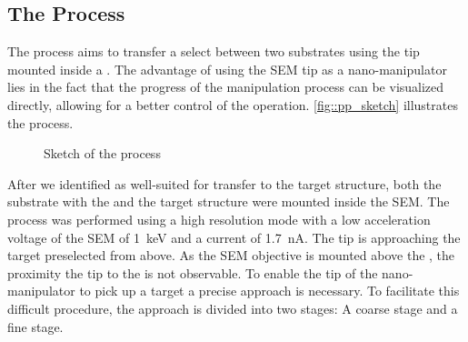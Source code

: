 	\subsection{The \PP Process}

			The \pp process aims to transfer a select \nd between two substrates using the tip mounted inside a \sem. The advantage of using the SEM tip as a nano-manipulator lies in the fact that the progress of the manipulation process can be visualized directly, allowing for a better control of the operation. \autoref{fig::pp_sketch} illustrates the process.

			\begin{figure}[htp]
				\centering
				\caption{Sketch of the \pp process}
				\label{fig::pp_sketch}
			\end{figure}

	After we identified \nds as well-suited for transfer to the target structure, both the substrate with the \nds and the target structure were mounted inside the SEM.
	The process was performed using a high resolution mode with a low acceleration voltage of the SEM of \SI{1}{\kilo\electronvolt} and a current of \SI{1.7}{\nano\ampere}.
	The tip is approaching the target preselected \nd from above.
	As the SEM objective is mounted above the \np, the proximity the \np tip  to the \nd is not observable.
	To enable the tip of the nano-manipulator to pick up a target \nd a precise approach is necessary. To facilitate this difficult procedure, the approach is divided into two stages: A coarse stage and a fine stage.

